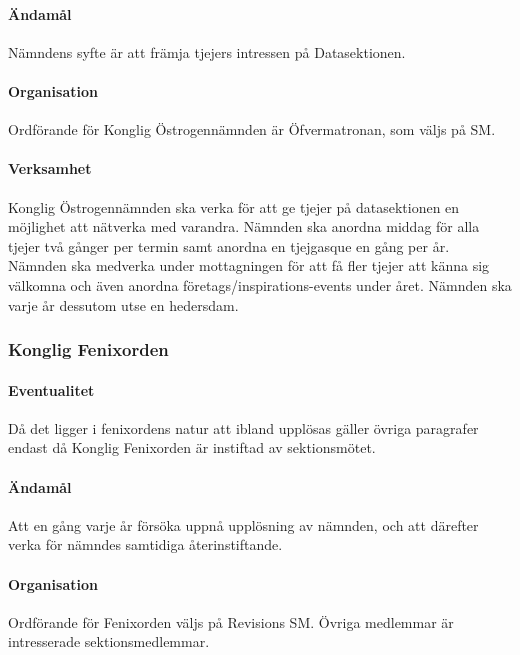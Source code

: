 \documentclass[a4paper,12pt]{article}
\begin{document}
\paragraph{Ändamål}

Nämndens syfte är att främja tjejers intressen på Datasektionen.

\paragraph{Organisation}

Ordförande för Konglig Östrogennämnden är Öfvermatronan, som väljs på SM.

\paragraph{Verksamhet}

Konglig Östrogennämnden ska verka för att ge tjejer på datasektionen en möjlighet att
nätverka med varandra. Nämnden ska anordna middag för alla tjejer två gånger per
termin samt anordna en tjejgasque en gång per år. Nämnden ska medverka under
mottagningen för att få fler tjejer att känna sig välkomna och även anordna
företags/inspirations-events under året. Nämnden ska varje år dessutom utse en
hedersdam.

\subsubsection{Konglig Fenixorden}

\paragraph{Eventualitet}

Då det ligger i fenixordens natur att ibland upplösas gäller övriga paragrafer endast då Konglig Fenixorden är instiftad av sektionsmötet.

\paragraph{Ändamål}

Att en gång varje år försöka uppnå upplösning av nämnden, och att därefter verka för nämndes samtidiga återinstiftande.

\paragraph{Organisation}

Ordförande för Fenixorden väljs på Revisions SM. Övriga medlemmar är intresserade sektionsmedlemmar.
\end{document}
